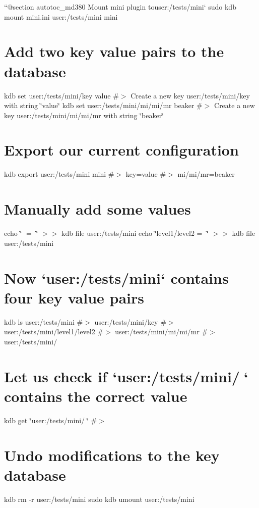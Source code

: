 ``{\ttfamily  @section autotoc\+\_\+md380 Mount mini plugin to}user\+:/tests/mini` sudo kdb mount mini.\+ini user\+:/tests/mini mini\hypertarget{autotoc_md377_autotoc_md381}{}\section{Add two key value pairs to the database}\label{autotoc_md377_autotoc_md381}
kdb set user\+:/tests/mini/key value \#$>$ Create a new key user\+:/tests/mini/key with string \char`\"{}value\char`\"{} kdb set user\+:/tests/mini/mi/mi/mr beaker \#$>$ Create a new key user\+:/tests/mini/mi/mi/mr with string \char`\"{}beaker\char`\"{}\hypertarget{autotoc_md377_autotoc_md382}{}\section{Export our current configuration}\label{autotoc_md377_autotoc_md382}
kdb export user\+:/tests/mini mini \#$>$ key=value \#$>$ mi/mi/mr=beaker\hypertarget{autotoc_md377_autotoc_md383}{}\section{Manually add some values}\label{autotoc_md377_autotoc_md383}
echo \char`\"{}🔑 = 🦄\char`\"{} $>$$>$ {\ttfamily kdb file user\+:/tests/mini} echo \char`\"{}level1/level2 = 👾\char`\"{} $>$$>$ {\ttfamily kdb file user\+:/tests/mini}\hypertarget{autotoc_md377_autotoc_md384}{}\section{Now `user\+:/tests/mini` contains four key value pairs}\label{autotoc_md377_autotoc_md384}
kdb ls user\+:/tests/mini \#$>$ user\+:/tests/mini/key \#$>$ user\+:/tests/mini/level1/level2 \#$>$ user\+:/tests/mini/mi/mi/mr \#$>$ user\+:/tests/mini/🔑\hypertarget{autotoc_md377_autotoc_md385}{}\section{Let us check if `user\+:/tests/mini/🔑` contains the correct value}\label{autotoc_md377_autotoc_md385}
kdb get \char`\"{}user\+:/tests/mini/🔑\char`\"{} \#$>$ 🦄\hypertarget{autotoc_md377_autotoc_md386}{}\section{Undo modifications to the key database}\label{autotoc_md377_autotoc_md386}
kdb rm -\/r user\+:/tests/mini sudo kdb umount user\+:/tests/mini 
